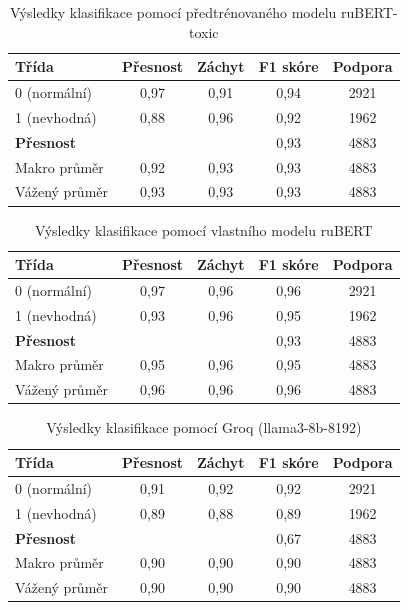 \documentclass[FM,Proj]{tulthesis}
\begin{document}
\begin{table}[H]
\centering
\caption{Výsledky klasifikace pomocí předtrénovaného modelu ruBERT-toxic}
\begin{tabular}{lcccc}
\hline
\textbf{Třída} & \textbf{Přesnost} & \textbf{Záchyt} & \textbf{F1 skóre} & \textbf{Podpora} \\
\hline
0 (normální)   & 0{,}97 & 0{,}91 & 0{,}94 & 2921 \\
1 (nevhodná)   & 0{,}88 & 0{,}96 & 0{,}92 & 1962 \\
\hline
\textbf{Přesnost} & & & {0{,}93} & 4883 \\
\hline
Makro průměr   & 0{,}92 & 0{,}93 & 0{,}93 & 4883 \\
Vážený průměr  & 0{,}93 & 0{,}93 & 0{,}93 & 4883 \\
\hline
\end{tabular}
\label{tab:rubert-toxic-results}
\end{table}

\begin{table}[H]
\centering
\caption{Výsledky klasifikace pomocí vlastního modelu ruBERT}
\begin{tabular}{lcccc}
\hline
\textbf{Třída} & \textbf{Přesnost} & \textbf{Záchyt} & \textbf{F1 skóre} & \textbf{Podpora} \\
\hline
0 (normální)   & 0{,}97 & 0{,}96 & 0{,}96 & 2921 \\
1 (nevhodná)   & 0{,}93 & 0{,}96 & 0{,}95 & 1962 \\
\hline
\textbf{Přesnost} & & & {0{,}93} & 4883 \\
\hline
Makro průměr   & 0{,}95 & 0{,}96 & 0{,}95 & 4883 \\
Vážený průměr  & 0{,}96 & 0{,}96 & 0{,}96 & 4883 \\
\hline
\end{tabular}
\label{tab:custom-rubert-results}
\end{table}

\begin{table}[H]
\centering
\caption{Výsledky klasifikace pomocí Groq (llama3-8b-8192)}
\begin{tabular}{lcccc}
\hline
\textbf{Třída} & \textbf{Přesnost} & \textbf{Záchyt} & \textbf{F1 skóre} & \textbf{Podpora} \\
\hline
0 (normální)   & 0{,}91 & 0{,}92 & 0{,}92 & 2921 \\
1 (nevhodná)   & 0{,}89 & 0{,}88 & 0{,}89 & 1962 \\
\hline
\textbf{Přesnost} & & & {0{,}67} & 4883 \\
\hline
Makro průměr   & 0{,}90 & 0{,}90 & 0{,}90 & 4883 \\
Vážený průměr  & 0{,}90 & 0{,}90 & 0{,}90 & 4883 \\
\hline
\end{tabular}
\label{tab:custom-rubert-results}
\end{table}
\end{document}
